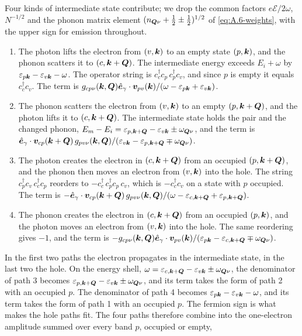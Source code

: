 Four kinds of intermediate state contribute; we drop the common factors $e\mathcal{E}/2\omega$, $N^{-1/2}$ and the phonon matrix element $(n_{\bm{Q}\nu} + \frac12 \pm \frac12)^{1/2}$ of \cref{eq:A.6-weights}, with the upper sign for emission throughout.
\begin{enumerate}
  \item The photon lifts the electron from $(v,\bm{k})$ to an empty state $(p,\bm{k})$, and the phonon scatters it to $(c,\bm{k}+\bm{Q})$. The intermediate energy exceeds $E_i + \omega$ by $\varepsilon_{p\bm{k}} - \varepsilon_{v\bm{k}} - \omega$. The operator string is $c^\dagger_cc_p\,c^\dagger_pc_v$, and since $p$ is empty it equals $c^\dagger_cc_v$. The term is $g_{cp\nu}(\bm{k},\bm{Q})\hat{\bm{e}}_\gamma\cdot\bm{v}_{pv}(\bm{k})/(\omega - \varepsilon_{p\bm{k}} + \varepsilon_{v\bm{k}})$.
  \item The phonon scatters the electron from $(v,\bm{k})$ to an empty $(p,\bm{k}+\bm{Q})$, and the photon lifts it to $(c,\bm{k}+\bm{Q})$. The intermediate state holds the pair and the changed phonon, $E_m - E_i = \varepsilon_{p,\bm{k}+\bm{Q}} - \varepsilon_{v\bm{k}} \pm \omega_{\bm{Q}\nu}$, and the term is $\hat{\bm{e}}_\gamma\cdot\bm{v}_{cp}(\bm{k}+\bm{Q})\,g_{pv\nu}(\bm{k},\bm{Q})/(\varepsilon_{v\bm{k}} - \varepsilon_{p,\bm{k}+\bm{Q}} \mp \omega_{\bm{Q}\nu})$.
  \item The photon creates the electron in $(c,\bm{k}+\bm{Q})$ from an occupied $(p,\bm{k}+\bm{Q})$, and the phonon then moves an electron from $(v,\bm{k})$ into the hole. The string $c^\dagger_pc_v\,c^\dagger_cc_p$ reorders to $-c^\dagger_c\,c^\dagger_pc_p\,c_v$, which is $-c^\dagger_cc_v$ on a state with $p$ occupied. The term is $-\hat{\bm{e}}_\gamma\cdot\bm{v}_{cp}(\bm{k}+\bm{Q})\,g_{pv\nu}(\bm{k},\bm{Q})/(\omega - \varepsilon_{c,\bm{k}+\bm{Q}} + \varepsilon_{p,\bm{k}+\bm{Q}})$.
  \item The phonon creates the electron in $(c,\bm{k}+\bm{Q})$ from an occupied $(p,\bm{k})$, and the photon moves an electron from $(v,\bm{k})$ into the hole. The same reordering gives $-1$, and the term is $-g_{cp\nu}(\bm{k},\bm{Q})\hat{\bm{e}}_\gamma\cdot\bm{v}_{pv}(\bm{k})/(\varepsilon_{p\bm{k}} - \varepsilon_{c,\bm{k}+\bm{Q}} \mp \omega_{\bm{Q}\nu})$.
\end{enumerate}
In the first two paths the electron propagates in the intermediate state, in the last two the hole. On the energy shell, $\omega = \varepsilon_{c,\bm{k}+\bm{Q}} - \varepsilon_{v\bm{k}} \pm \omega_{\bm{Q}\nu}$, the denominator of path 3 becomes $\varepsilon_{p,\bm{k}+\bm{Q}} - \varepsilon_{v\bm{k}} \pm \omega_{\bm{Q}\nu}$, and its term takes the form of path 2 with an occupied $p$. The denominator of path 4 becomes $\varepsilon_{p\bm{k}} - \varepsilon_{v\bm{k}} - \omega$, and its term takes the form of path 1 with an occupied $p$. The fermion sign is what makes the hole paths fit. The four paths therefore combine into the one-electron amplitude summed over every band $p$, occupied or empty,
